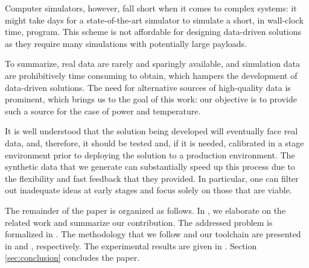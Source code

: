 Computer simulators, however, fall short when it comes to complex systems: it
might take days for a state-of-the-art simulator to simulate a short, in
wall-clock time, program. This scheme is not affordable for designing
data-driven solutions as they require many simulations with potentially large
payloads.

To summarize, real data are rarely and sparingly available, and simulation data
are prohibitively time consuming to obtain, which hampers the development of
data-driven solutions. The need for alternative sources of high-quality data is
prominent, which brings us to the goal of this work: our objective is to provide
such a source for the case of power and temperature.

It is well understood that the solution being developed will eventually face
real data, and, therefore, it should be tested and, if it is needed, calibrated
in a stage environment prior to deploying the solution to a production
environment. The synthetic data that we generate can substantially speed up this
process due to the flexibility and fast feedback that they provided. In
particular, one can filter out inadequate ideas at early stages and focus solely
on those that are viable.

The remainder of the paper is organized as follows. In , we
elaborate on the related work and summarize our contribution. The addressed
problem is formalized in . The methodology that we follow and our
toolchain are presented in  and ,
respectively. The experimental results are given in . Section
\ref{sec:conclusion} concludes the paper.
